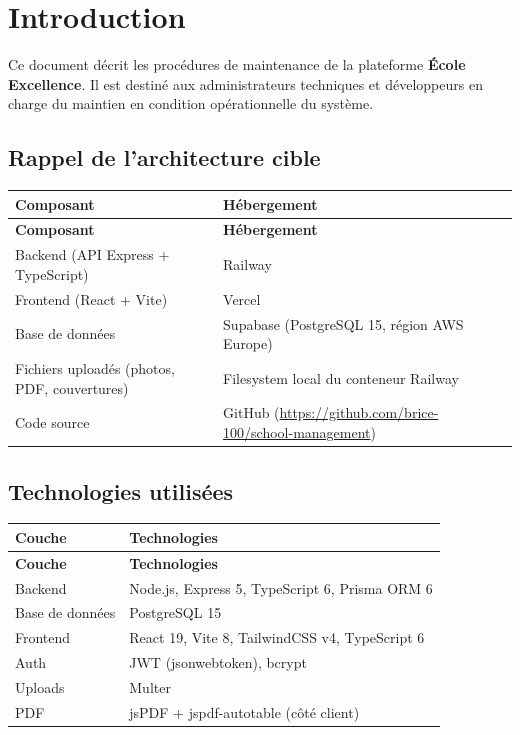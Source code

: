 \documentclass[12pt,a4paper]{report}
\begin{document}
\setlength{\extrarowheight}{5pt}
\renewcommand{\arraystretch}{1.3}

\tableofcontents
\newpage

\chapter{Introduction}

Ce document décrit les procédures de maintenance de la plateforme \textbf{École Excellence}. Il est destiné aux administrateurs techniques et développeurs en charge du maintien en condition opérationnelle du système.

\section{Rappel de l'architecture cible}

\begin{longtable}{|p{4cm}|p{10.5cm}|}
\hline
\textbf{Composant} & \textbf{Hébergement} \\
\hline
\endfirsthead
\hline
\textbf{Composant} & \textbf{Hébergement} \\
\hline
\endhead
Backend (API Express + TypeScript) & Railway \\
\hline
Frontend (React + Vite) & Vercel \\
\hline
Base de données & Supabase (PostgreSQL 15, région AWS Europe) \\
\hline
Fichiers uploadés (photos, PDF, couvertures) & Filesystem local du conteneur Railway \\
\hline
Code source & GitHub (\url{https://github.com/brice-100/school-management}) \\
\hline
\end{longtable}

\section{Technologies utilisées}

\begin{longtable}{|p{4cm}|p{10.5cm}|}
\hline
\textbf{Couche} & \textbf{Technologies} \\
\hline
\endfirsthead
\hline
\textbf{Couche} & \textbf{Technologies} \\
\hline
\endhead
Backend & Node.js, Express 5, TypeScript 6, Prisma ORM 6 \\
\hline
Base de données & PostgreSQL 15 \\
\hline
Frontend & React 19, Vite 8, TailwindCSS v4, TypeScript 6 \\
\hline
Auth & JWT (jsonwebtoken), bcrypt \\
\hline
Uploads & Multer \\
\hline
PDF & jsPDF + jspdf-autotable (côté client) \\
\hline
\end{longtable}
\end{document}
